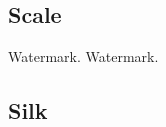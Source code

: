 \clearpage
\renewcommand{\matName}{Scale}
\subsection{\matName}

\renewcommand{\imgNumber}{01}
{}{}
\renewcommand{\imgNumber}{02}
{}{}
\renewcommand{\imgNumber}{03}
{}{}
\renewcommand{\imgNumber}{04}
{}{}
\renewcommand{\imgNumber}{05}
{}{}
\renewcommand{\imgNumber}{06}
{Watermark.}{}
\renewcommand{\imgNumber}{07}
{Watermark.}{}
\renewcommand{\imgNumber}{08}
{}{}
\renewcommand{\imgNumber}{09}
{}{}
\renewcommand{\imgNumber}{10}
{}{}
\renewcommand{\imgNumber}{11}
{}{}
\renewcommand{\imgNumber}{12}
{}{}

\clearpage
\renewcommand{\matName}{Silk}
\subsection{\matName}

\renewcommand{\imgNumber}{01}
{}{}
\renewcommand{\imgNumber}{02}
{}{}
\renewcommand{\imgNumber}{03}
{}{}
\renewcommand{\imgNumber}{04}
{}{}
\renewcommand{\imgNumber}{05}
{}{}
\renewcommand{\imgNumber}{06}
{}{}
\renewcommand{\imgNumber}{07}
{}{}
\renewcommand{\imgNumber}{08}
{}{}
\renewcommand{\imgNumber}{09}
{}{}
\renewcommand{\imgNumber}{10}
{}{}
\renewcommand{\imgNumber}{11}
{}{}
\renewcommand{\imgNumber}{12}
{}{}

